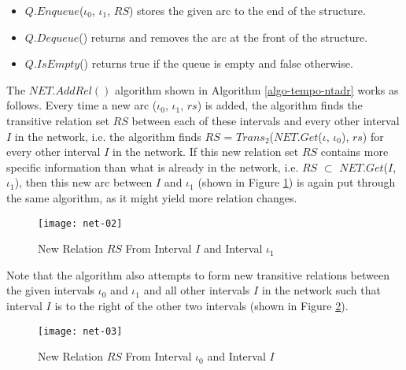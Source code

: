 \documentclass[11pt]{report}
\begin{document}
          \begin{itemize}
            \item
              $Q.Enqueue$($\iota_0$, $\iota_1$, $RS$) stores the given arc to
              the end of the structure.

            \item
              $Q.Dequeue$() returns and removes the arc at the front of the
              structure.

            \item
              $Q.IsEmpty$() returns true if the queue is empty and false
              otherwise.
          \end{itemize}

          The $NET.AddRel()$ algorithm shown in Algorithm
          \ref{algo-tempo-ntadr} works as follows. Every time a new arc
          ($\iota_0$, $\iota_1$, $rs$) is added, the algorithm finds the
          transitive relation set $RS$ between each of these intervals and
          every other interval $I$ in the network, i.e. the algorithm finds
          $RS$ = $Trans_2$($NET.Get$($\iota$, $\iota_0$), $rs$) for every other
          interval $I$ in the network. If this new relation set $RS$
          contains more specific information than what is already in the
          network, i.e. $RS$ $\subset$ $NET.Get$($I$, $\iota_1$), then this new
          arc between $I$ and $\iota_1$ (shown in Figure
          \ref{figu-tempo-ntwk2}) is again put through the same algorithm, as
          it might yield more relation changes.

          \begin{figure}[tbhp]
            \begin{center}
              \texttt{[image: net-02]}
              \caption{New Relation $RS$ From Interval $I$ and Interval $\iota_1$}
              \label{figu-tempo-ntwk2}
            \end{center}
          \end{figure}

          Note that the algorithm also attempts to form new transitive
          relations between the given intervals $\iota_0$ and $\iota_1$ and all
          other intervals $I$ in the network such that interval $I$ is to the
          right of the other two intervals (shown in Figure
          \ref{figu-tempo-ntwk3}).

          \begin{figure}[tbhp]
            \begin{center}
              \texttt{[image: net-03]}
              \caption{New Relation $RS$ From Interval $\iota_0$ and Interval $I$}
              \label{figu-tempo-ntwk3}
            \end{center}
          \end{figure}
\end{document}

